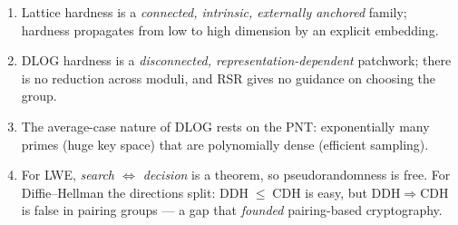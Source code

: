 \documentclass[11pt]{article}
\theoremstyle{definition}
\theoremstyle{plain}
\theoremstyle{remark}
\newcommand{\cdh}{\mathrm{CDH}}
\newcommand{\ddh}{\mathrm{DDH}}
\newcommand{\reduces}{\;\leq\;}
\begin{document}
\begin{keybox}[Takeaways]
\begin{enumerate}[leftmargin=1.5em,nosep]
  \item Lattice hardness is a \emph{connected, intrinsic, externally anchored} family;
        hardness propagates from low to high dimension by an explicit embedding.
  \item DLOG hardness is a \emph{disconnected, representation-dependent} patchwork; there is
        no reduction across moduli, and RSR gives no guidance on choosing the group.
  \item The average-case nature of DLOG rests on the PNT: exponentially many primes
        (huge key space) that are polynomially dense (efficient sampling).
  \item For LWE, \emph{search $\Leftrightarrow$ decision} is a theorem, so pseudorandomness
        is free. For Diffie--Hellman the directions split: $\ddh\reduces\cdh$ is easy, but
        $\ddh\Rightarrow\cdh$ is false in pairing groups --- a gap that \emph{founded}
        pairing-based cryptography.
\end{enumerate}
\end{keybox}
\end{document}
